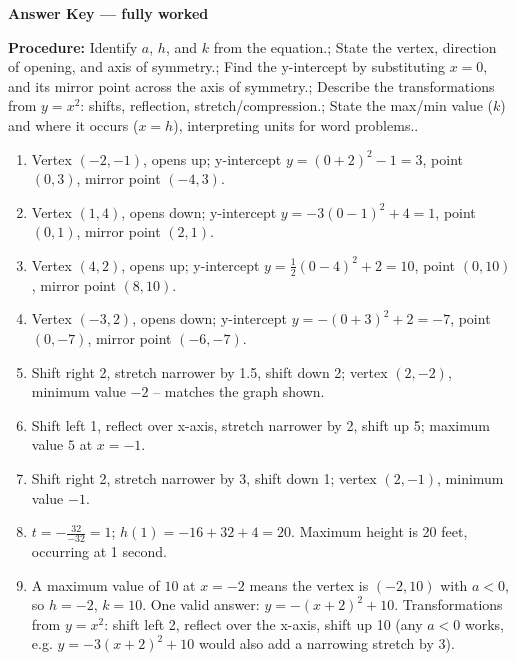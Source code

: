 \documentclass[12pt]{article}
\begin{document}
\begin{center}{\Large \textbf{Answer Key --- fully worked}}\end{center}
\vspace{0.25cm}
\textbf{Procedure:} Identify $a$, $h$, and $k$ from the equation.; State the vertex, direction of opening, and axis of symmetry.; Find the y-intercept by substituting $x=0$, and its mirror point across the axis of symmetry.; Describe the transformations from $y=x^2$: shifts, reflection, stretch/compression.; State the max/min value ($k$) and where it occurs ($x=h$), interpreting units for word problems..\\[8pt]
\begin{enumerate}[label=\textbf{\arabic*.},itemsep=7pt]
  \item Vertex $(-2,-1)$, opens up; y-intercept $y=(0+2)^2-1=3$, point $(0,3)$, mirror point $(-4,3)$.
  \item Vertex $(1,4)$, opens down; y-intercept $y=-3(0-1)^2+4=1$, point $(0,1)$, mirror point $(2,1)$.
  \item Vertex $(4,2)$, opens up; y-intercept $y=\frac{1}{2}(0-4)^2+2=10$, point $(0,10)$, mirror point $(8,10)$.
  \item Vertex $(-3,2)$, opens down; y-intercept $y=-(0+3)^2+2=-7$, point $(0,-7)$, mirror point $(-6,-7)$.
  \item Shift right 2, stretch narrower by 1.5, shift down 2; vertex $(2,-2)$, minimum value $-2$ -- matches the graph shown.
  \item Shift left 1, reflect over x-axis, stretch narrower by 2, shift up 5; maximum value $5$ at $x=-1$.
  \item Shift right 2, stretch narrower by 3, shift down 1; vertex $(2,-1)$, minimum value $-1$.
  \item $t=-\frac{32}{-32}=1$; $h(1)=-16+32+4=20$. Maximum height is 20 feet, occurring at 1 second.
  \item A maximum value of $10$ at $x=-2$ means the vertex is $(-2,10)$ with $a<0$, so $h=-2$, $k=10$. One valid answer: $y=-(x+2)^2+10$. Transformations from $y=x^2$: shift left 2, reflect over the x-axis, shift up 10 (any $a<0$ works, e.g. $y=-3(x+2)^2+10$ would also add a narrowing stretch by 3).
\end{enumerate}
\end{document}
